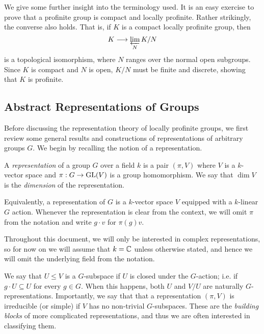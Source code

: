 \begin{examples}
\begin{enumerate}
    \end{enumerate}
\end{examples}

We give some further insight into the terminology used. It is an easy exercise to prove that a profinite group is compact and locally profinite. Rather strikingly, the converse also holds. That is, if $K$ is a compact locally profinite group, then
$$K\longrightarrow\varprojlim_N K/N$$
is a topological isomorphism, where $N$ ranges over the normal open subgroups. Since $K$ is compact and $N$ is open, $K/N$ must be finite and discrete, showing that $K$ is profinite.

\subsection{Abstract Representations of Groups} \label{Abstract_Reps}
Before discussing the representation theory of locally profinite groups, we first review some general results and constructions of representations of arbitrary groups $G$. We begin by recalling the notion of a representation.

\begin{defn}
    A \textit{representation} of a group $G$ over a field $k$ is a pair $(\pi,V)$ where $V$ is a $k$-vector space and $\pi:G\rightarrow\mathrm{GL}(V)$ is a group homomorphism. We say that $\dim V$ is the \textit{dimension} of the representation.
\end{defn}

Equivalently, a representation of $G$ is a $k$-vector space $V$ equipped with a $k$-linear $G$ action. Whenever the representation is clear from the context, we will omit $\pi$ from the notation and write $g\cdot v$ for $\pi(g)v$. 

Throughout this document, we will only be interested in complex representations, so for now on we will assume that $k=\mathbb{C}$ unless otherwise stated, and hence we will omit the underlying field from the notation.

We say that $U\leq V$ is a $G$-subspace if $U$ is closed under the $G$-action; i.e. if $g\cdot U\subseteq U$ for every $g\in G$. When this happens, both $U$ and $V/U$ are naturally $G$-representations. Importantly, we say that that a representation $(\pi,V)$ is irreducible (or simple) if $V$ has no non-trivial $G$-subspaces. These are the \textit{building blocks} of more complicated representations, and thus we are often interested in classifying them.

